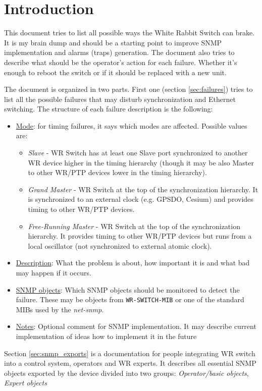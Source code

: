 \section{Introduction}

This document tries to list all possible ways the White Rabbit Switch can
brake. It is my brain dump and should be a starting point to improve SNMP
implementation and alarms (traps) generation. The document also tries to
describe what should be the operator's action for each failure. Whether it's
enough to reboot the switch or if it should be replaced with a new unit.

The document is organized in two parts. First one (section \ref{sec:failures})
tries to list all the possible failures that may disturb synchronization and
Ethernet switching. The structure of each failure description is the following:
\begin{itemize}[leftmargin=0pt]
	\item [] \underline{Mode}: for timing failures, it says which modes are
		affected. Possible values are:
		\begin{itemize}
			\item \emph{Slave} - WR Switch has at least one Slave port synchronized to
				another WR device higher in the timing hierarchy (though it may be also
				Master to other WR/PTP devices lower in the timing hierarchy).
			\item \emph{Grand Master} - WR Switch at the top of the synchronization
				hierarchy. It is synchronized to an external clock (e.g. GPSDO, Cesium)
				and provides timing to other WR/PTP devices.
			\item \emph{Free-Running Master} - WR Switch at the top of the
				synchronization hierarchy. It provides timing to other WR/PTP devices
				but runs from a local oscillator (not synchronized to external atomic
				clock).
		\end{itemize}

	\item [] \underline{Description}: What the problem is about, how important it
		is and what bad may happen if it occurs.
	\item [] \underline{SNMP objects}: Which SNMP objects should be monitored to
		detect the failure. These may be objects from \texttt{WR-SWITCH-MIB} or one
		of the standard MIBs used by the \emph{net-snmp}.
	\item [] \underline{Notes}: Optional comment for SNMP implementation. It may describe current
		implementation of ideas how to implement it in the future
\end{itemize}

Section \ref{sec:snmp_exports} is a documentation for people integrating WR
switch into a control system, operators and WR experts. It describes all
essential SNMP objects exported by the device divided into two groups:
\emph{Operator/basic objects}, \emph{Expert objects}
